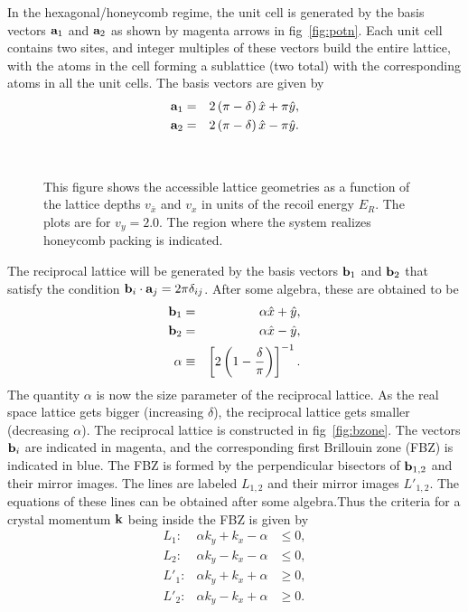 \documentclass[a4paper,10pt]{article}
\begin{document}
In the hexagonal/honeycomb regime, the unit cell is generated by the basis vectors ${\bf a}_1$ and ${\bf a}_2$ as shown by magenta arrows in fig~\ref{fig:potn}. Each unit cell contains two sites, and integer multiples of these vectors build the entire lattice, with the atoms in the cell forming a sublattice (two total) with the corresponding atoms in all the unit cells. The basis vectors are given by
\begin{eqnarray}
\label{eq:basis}
{\bf a}_1 &=& 2\left(\pi-\delta\right)\hat{x} + \pi \hat{y},\nonumber \\
{\bf a}_2 &=& 2\left(\pi-\delta\right)\hat{x}-\pi \hat{y}.
\end{eqnarray}
\begin{figure}[h!bt]
\ 
\caption{This figure shows the accessible lattice geometries as a function of the lattice depths $v_{\bar{x}}$ and $v_x$ in units of the recoil energy $E_R$. The plots are for $v_y=2.0$. The region where the system realizes honeycomb packing is indicated.}
\label{fig:params}
\end{figure}
The reciprocal lattice will be generated by the basis vectors ${\bf b}_1$ and ${\bf b}_2$ that satisfy the condition ${\bf b}_i \cdot {\bf a}_j = 2\pi \delta_{ij}$. After some algebra, these are obtained to be
\begin{eqnarray}
\label{eq:basis:recip}
{\bf b}_1 &=& \alpha \hat{x} + \hat{y},\nonumber \\
{\bf b}_2 &=& \alpha \hat{x}- \hat{y},\nonumber \\
\alpha &\equiv& \left[2\left(1-\frac{\delta}{\pi}\right)\right]^{-1}.
\end{eqnarray}
The quantity $\alpha$ is now the size parameter of the reciprocal lattice. As the real space lattice gets bigger (increasing $\delta$), the reciprocal lattice gets smaller (decreasing $\alpha$). The reciprocal lattice is constructed in fig~\ref{fig:bzone}. The vectors ${\bf b}_i$ are indicated in magenta, and the corresponding first Brillouin zone (FBZ) is indicated in blue. The FBZ is formed by the perpendicular bisectors of ${\bf b}_{1,2}$ and their mirror images. The lines are labeled $L_{1,2}$ and their mirror images $L'_{1,2}$. The equations of these lines can be obtained after some algebra.Thus the criteria for a crystal momentum ${\bf k}$ being inside the FBZ is given by 
\begin{equation} 
\label{eq:bzone}
\begin{array}{rcl} 
L_1  :& \alpha k_y+k_x-\alpha   &\leq0 , \\
L_2  :&  \alpha k_y-k_x-\alpha  &\leq0 , \\
L'_1  :& \alpha k_y+k_x+\alpha  &\geq0 , \\
L'_2  :& \alpha k_y-k_x+\alpha  &\geq0 .
\end{array}
\end{equation}
\end{document}
